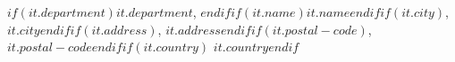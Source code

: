 $if(it.department)$$it.department$, $endif$$if(it.name)$$it.name$$endif$$if(it.city)$, $it.city$$endif$$if(it.address)$, $it.address$$endif$$if(it.postal-code)$, $it.postal-code$$endif$$if(it.country)$ $it.country$$endif$